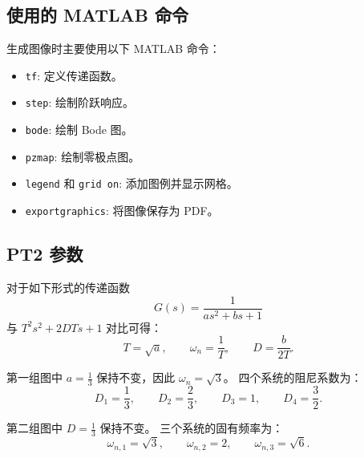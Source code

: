 \subsection{使用的 MATLAB 命令}

生成图像时主要使用以下 MATLAB 命令：

\begin{itemize}
  \item \texttt{tf}: 定义传递函数。
  \item \texttt{step}: 绘制阶跃响应。
  \item \texttt{bode}: 绘制 Bode 图。
  \item \texttt{pzmap}: 绘制零极点图。
  \item \texttt{legend} 和 \texttt{grid on}: 添加图例并显示网格。
  \item \texttt{exportgraphics}: 将图像保存为 PDF。
\end{itemize}

\subsection{PT2 参数}

对于如下形式的传递函数
\[
  G(s)=\frac{1}{a s^2 + b s + 1}
\]
与 $T^2s^2+2DTs+1$ 对比可得：
\[
  T=\sqrt{a},\qquad \omega_n=\frac{1}{T},\qquad D=\frac{b}{2T}.
\]

第一组图中 $a=\frac{1}{3}$ 保持不变，因此 $\omega_n=\sqrt{3}$。
四个系统的阻尼系数为：
\[
  D_1=\frac{1}{3},\qquad
  D_2=\frac{2}{3},\qquad
  D_3=1,\qquad
  D_4=\frac{3}{2}.
\]

第二组图中 $D=\frac{1}{3}$ 保持不变。
三个系统的固有频率为：
\[
  \omega_{n,1}=\sqrt{3},\qquad
  \omega_{n,2}=2,\qquad
  \omega_{n,3}=\sqrt{6}.
\]
